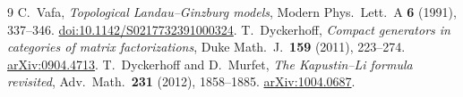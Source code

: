 \documentclass[11pt]{article}
\begin{document}
\begin{thebibliography}{9}\small
{} C.~Vafa, \emph{Topological Landau--Ginzburg models},
Modern Phys.\ Lett.\ A \textbf{6} (1991), 337--346.
\href{https://doi.org/10.1142/S0217732391000324}{doi:10.1142/S0217732391000324}.
 T.~Dyckerhoff, \emph{Compact generators in categories of
matrix factorizations}, Duke Math.\ J.\ \textbf{159} (2011), 223--274.
\href{https://arxiv.org/abs/0904.4713}{arXiv:0904.4713}.
 T.~Dyckerhoff and D.~Murfet, \emph{The
Kapustin--Li formula revisited}, Adv.\ Math.\ \textbf{231} (2012),
1858--1885. \href{https://arxiv.org/abs/1004.0687}{arXiv:1004.0687}.
\end{thebibliography}
\end{document}
